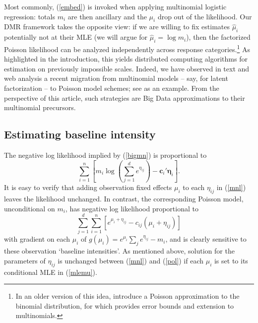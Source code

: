\documentclass[12pt]{article}
\newcommand{\bs}[1]{\boldsymbol{#1}}
\newcommand{\bm}[1]{\mathbf{#1}}
\begin{document}
Most commonly, (\ref{embed}) is invoked when applying multinomial logistic
regression: totals $m_i$ are then ancillary and the $\mu_i$ drop out of the
likelihood.  Our DMR framework takes the opposite view: if we are willing to
fix estimates $\hat\mu_i$ potentially not at their MLE (we will argue for
$\hat\mu_i = \log m_i$), then the factorized Poisson likelihood can be
analyzed independently across response categories.\footnote{In an older version
of this idea, \cite{hodges_poisson_1960} introduce a Poisson approximation
to the binomial distribution, for which
\cite{mcdonald_poisson_1980} provides error bounds and extension to
multinomials.} As highlighted in the introduction, this yields distributed
computing algorithms for estimation on previously impossible scales.  Indeed,
we have observed in text and web analysis a recent migration from multinomial
models -- say, for latent factorization -- to Poisson model schemes; see
\citet{gopalan_scalable_2013} as an example.  From the perspective of this
article, such strategies are Big Data approximations to their
multinomial precursors.


\subsection{Estimating baseline intensity}
\label{MU}

The negative log likelihood implied by  (\ref{bigmn}) is proportional to
\begin{equation}
\label{mnl} \sum_{i=1}^n\left[ m_i\log\left(\sum_{j=1}^d e^{\eta_{ij}}\right)
- \bm{c}_{i}'\bs{\eta}_{i} \right]. 
\end{equation} 
It is easy to verify that adding observation fixed effects $\mu_i$ to each
$\eta_{ij}$ in (\ref{mnl}) leaves the likelihood unchanged.  In contrast, the
corresponding Poisson model, unconditional on $m_i$, has negative log
likelihood proportional to 
\begin{equation} \label{pol}
\sum_{j=1}^d\sum_{i=1}^n\left[ e^{\mu_i + \eta_{ij}} - c_{ij}(\mu_i +
\eta_{ij}) \right] 
\end{equation} 
with gradient on each $\mu_i$ of $g(\mu_i) =
e^{\mu_i}\sum_j e^{\eta_{ij}} - m_i$, and  is clearly sensitive to these
observation `baseline intensities'.  As mentioned above, solution for the
parameters of $\eta_{ij}$ is unchanged between (\ref{mnl}) and (\ref{pol}) if
each $\mu_i$ is set to its conditional MLE in (\ref{mlemu}).
\end{document}
